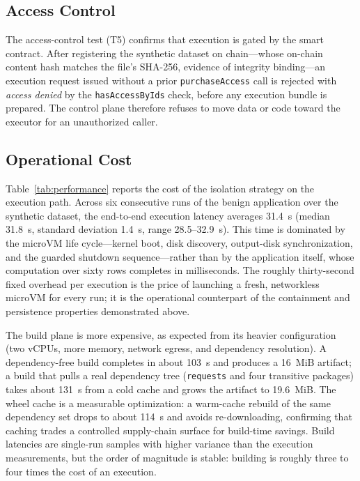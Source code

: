 \subsection{Access Control}

The access-control test (T5) confirms that execution is gated by the smart
contract. After registering the synthetic dataset on chain---whose on-chain
content hash matches the file's SHA-256, evidence of integrity binding---an
execution request issued without a prior \texttt{purchaseAccess} call is rejected
with \emph{access denied} by the \texttt{hasAccessByIds} check, before any
execution bundle is prepared. The control plane therefore refuses to move data or
code toward the executor for an unauthorized caller.

\subsection{Operational Cost}

Table~\ref{tab:performance} reports the cost of the isolation strategy on the
execution path. Across six consecutive runs of the benign application over the
synthetic dataset, the end-to-end execution latency averages 31.4~s
(median 31.8~s, standard deviation 1.4~s, range 28.5--32.9~s). This time is
dominated by the microVM life cycle---kernel boot, disk discovery, output-disk
synchronization, and the guarded shutdown sequence---rather than by the
application itself, whose computation over sixty rows completes in milliseconds.
The roughly thirty-second fixed overhead per execution is the price of launching
a fresh, networkless microVM for every run; it is the operational counterpart of
the containment and persistence properties demonstrated above.

The build plane is more expensive, as expected from its heavier configuration
(two vCPUs, more memory, network egress, and dependency resolution). A
dependency-free build completes in about 103~s and produces a 16~MiB artifact; a
build that pulls a real dependency tree (\texttt{requests} and four transitive
packages) takes about 131~s from a cold cache and grows the artifact to 19.6~MiB.
The wheel cache is a measurable optimization: a warm-cache rebuild of the same
dependency set drops to about 114~s and avoids re-downloading, confirming that
caching trades a controlled supply-chain surface for build-time savings. Build
latencies are single-run samples with higher variance than the execution
measurements, but the order of magnitude is stable: building is roughly three to
four times the cost of an execution.

